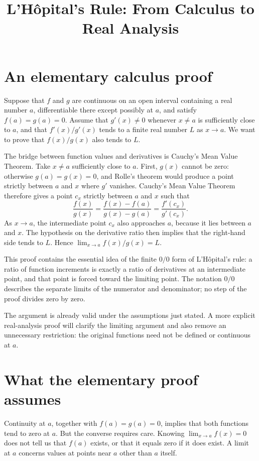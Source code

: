\documentclass{essay}
\title{L'H\^opital's Rule: From Calculus to Real Analysis}
\author{}
\date{}
\begin{document}
\maketitle

\section{An elementary calculus proof}

Suppose that \(f\) and \(g\) are continuous on an open interval containing a
real number \(a\), differentiable there except possibly at \(a\), and satisfy
\(f(a)=g(a)=0\). Assume that \(g'(x)\ne0\) whenever \(x\ne a\) is sufficiently
close to \(a\), and that \(f'(x)/g'(x)\) tends to a finite real number \(L\) as
\(x\to a\). We want to prove that \(f(x)/g(x)\) also tends to \(L\).

The bridge between function values and derivatives is Cauchy's Mean Value
Theorem. Take \(x\ne a\) sufficiently close to \(a\). First, \(g(x)\) cannot be
zero: otherwise \(g(a)=g(x)=0\), and Rolle's theorem would produce a point
strictly between \(a\) and \(x\) where \(g'\) vanishes. Cauchy's Mean Value Theorem
therefore gives a point \(c_{x}\) strictly between \(a\) and \(x\) such that
\[ \frac{f(x)}{g(x)} =\frac{f(x)-f(a)}{g(x)-g(a)} =\frac{f'(c_{x})}{g'(c_{x})}. \]
As \(x\to a\), the intermediate point \(c_{x}\) also approaches \(a\), because it
lies between \(a\) and \(x\). The hypothesis on the derivative ratio then
implies that the right-hand side tends to \(L\). Hence
\(\lim_{x\to a}f(x)/g(x)=L\).

This proof contains the essential idea of the finite \(0/0\) form of
L'H\^opital's rule: a ratio of function increments is exactly a ratio of
derivatives at an intermediate point, and that point is forced toward the
limiting point. The notation \(0/0\) describes the separate limits of the
numerator and denominator; no step of the proof divides zero by zero.

The argument is already valid under the assumptions just stated. A more
explicit real-analysis proof will clarify the limiting argument and also
remove an unnecessary restriction: the original functions need not be
defined or continuous at \(a\).

\section{What the elementary proof assumes}

Continuity at \(a\), together with \(f(a)=g(a)=0\), implies that both functions
tend to zero at \(a\). But the converse requires care. Knowing
\(\lim_{x\to a}f(x)=0\) does not tell us that \(f(a)\) exists, or that it equals
zero if it does exist. A limit at \(a\) concerns values at points near \(a\)
other than \(a\) itself.
\end{document}
